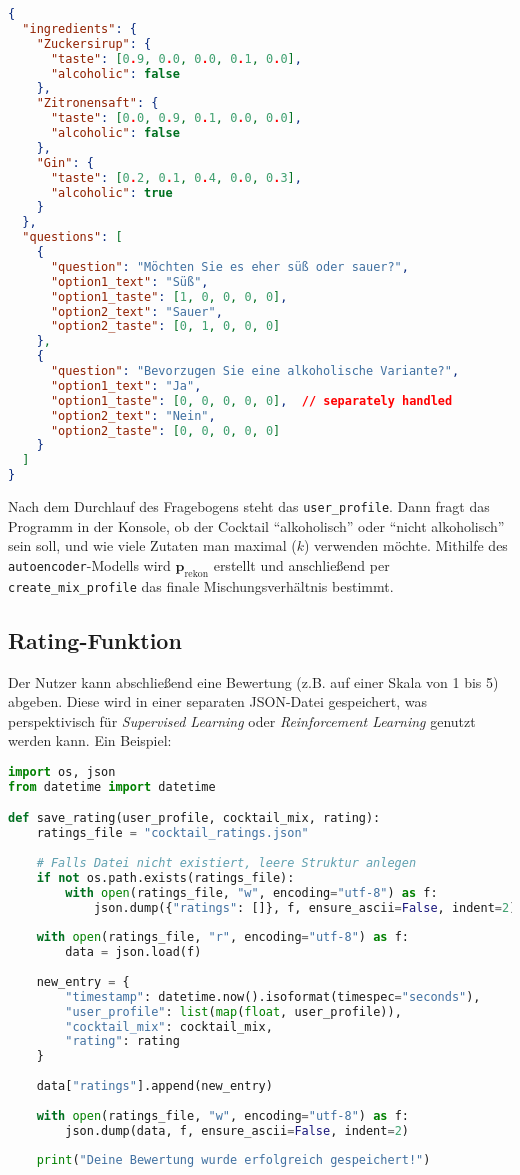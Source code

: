 \documentclass[12pt,a4paper]{report}
\begin{document}
\begin{lstlisting}[language=json, caption={Exemplarische JSON mit Fragen und Zutaten}]
{
  "ingredients": {
    "Zuckersirup": {
      "taste": [0.9, 0.0, 0.0, 0.1, 0.0],
      "alcoholic": false
    },
    "Zitronensaft": {
      "taste": [0.0, 0.9, 0.1, 0.0, 0.0],
      "alcoholic": false
    },
    "Gin": {
      "taste": [0.2, 0.1, 0.4, 0.0, 0.3],
      "alcoholic": true
    }
  },
  "questions": [
    {
      "question": "Möchten Sie es eher süß oder sauer?",
      "option1_text": "Süß",
      "option1_taste": [1, 0, 0, 0, 0],
      "option2_text": "Sauer",
      "option2_taste": [0, 1, 0, 0, 0]
    },
    {
      "question": "Bevorzugen Sie eine alkoholische Variante?",
      "option1_text": "Ja",
      "option1_taste": [0, 0, 0, 0, 0],  // separately handled
      "option2_text": "Nein",
      "option2_taste": [0, 0, 0, 0, 0]
    }
  ]
}
\end{lstlisting}

Nach dem Durchlauf des Fragebogens steht das \texttt{user\_profile}. Dann fragt das Programm in der Konsole, ob der Cocktail \enquote{alkoholisch} oder \enquote{nicht alkoholisch} sein soll, und wie viele Zutaten man maximal (\(k\)) verwenden möchte. Mithilfe des \texttt{autoencoder}-Modells wird \(\mathbf{p}_{\text{rekon}}\) erstellt und anschließend per \texttt{create\_mix\_profile} das finale Mischungsverhältnis bestimmt.

\subsection{Rating-Funktion}
Der Nutzer kann abschließend eine Bewertung (z.B. auf einer Skala von 1 bis 5) abgeben. Diese wird in einer separaten JSON-Datei gespeichert, was perspektivisch für \emph{Supervised Learning} oder \emph{Reinforcement Learning} genutzt werden kann. Ein Beispiel:

\begin{lstlisting}[language=Python, caption={Speichern einer Nutzerbewertung in einer JSON-Datei}]
import os, json
from datetime import datetime

def save_rating(user_profile, cocktail_mix, rating):
    ratings_file = "cocktail_ratings.json"
    
    # Falls Datei nicht existiert, leere Struktur anlegen
    if not os.path.exists(ratings_file):
        with open(ratings_file, "w", encoding="utf-8") as f:
            json.dump({"ratings": []}, f, ensure_ascii=False, indent=2)
    
    with open(ratings_file, "r", encoding="utf-8") as f:
        data = json.load(f)
    
    new_entry = {
        "timestamp": datetime.now().isoformat(timespec="seconds"),
        "user_profile": list(map(float, user_profile)),
        "cocktail_mix": cocktail_mix,
        "rating": rating
    }
    
    data["ratings"].append(new_entry)
    
    with open(ratings_file, "w", encoding="utf-8") as f:
        json.dump(data, f, ensure_ascii=False, indent=2)
    
    print("Deine Bewertung wurde erfolgreich gespeichert!")
\end{lstlisting}
\end{document}
